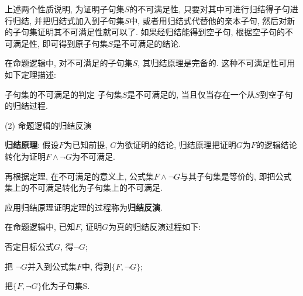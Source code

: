 上述两个性质说明, 为证明子句集$S$的不可满足性, 只要对其中可进行归结得子句进行归结, 并把归结式加入到子句集$S$中, 或者用归结式代替他的亲本子句, 然后对新的子句集证明其不可满足性就可以了.
如果经归结能得到空子句, 根据空子句的不可满足性, 即可得到原子句集$S$是不可满足的结论.

在命题逻辑中, 对不可满足的子句集$S$, 其归结原理是完备的.
这种不可满足性可用如下定理描述:
\begin{mythm}{子句集的不可满足的判定}{}\label{AIthm3.3}
    子句集$S$是不可满足的, 当且仅当存在一个从$S$到空子句的归结过程.
\end{mythm}

(2) 命题逻辑的归结反演

\textbf{归结原理}: 假设$F$为已知前提, $G$为欲证明的结论, 归结原理把证明$G$为$F$的逻辑结论转化为证明$F\wedge \neg G$为不可满足.

再根据定理\label{thm361}, 在不可满足的意义上, 公式集$F\wedge \neg G$与其子句集是等价的, 即把公式集上的不可满足转化为子句集上的不可满足.

应用归结原理证明定理的过程称为\textbf{归结反演}.

在命题逻辑中, 已知$F$, 证明$G$为真的归结反演过程如下:

    \quad{} 否定目标公式$G$, 得$\neg G$;

    \quad{} 把 $\neg G$并入到公式集$F$中, 得到$\{F, \neg G\}$;

    \quad{} 把$\{F, \neg G\}$化为子句集S.

